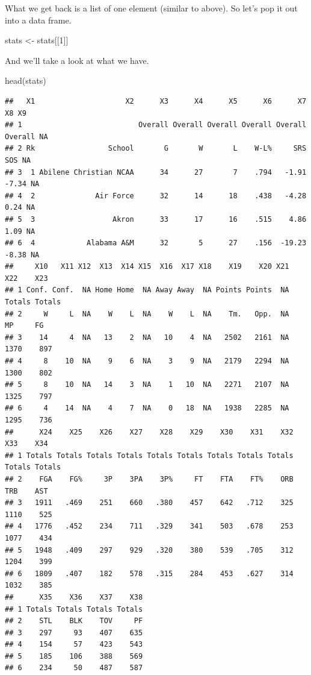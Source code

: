 \documentclass[
]{book}
\newenvironment{Shaded}{\begin{snugshade}}{\end{snugshade}}
\newcommand{\DecValTok}[1]{\textcolor[rgb]{0.00,0.00,0.81}{#1}}
\newcommand{\FunctionTok}[1]{\textcolor[rgb]{0.00,0.00,0.00}{#1}}
\newcommand{\NormalTok}[1]{#1}
\newcommand{\OtherTok}[1]{\textcolor[rgb]{0.56,0.35,0.01}{#1}}
\begin{document}
What we get back is a list of one element (similar to above). So let's pop it out into a data frame.

\begin{Shaded}
\begin{Highlighting}[]
\NormalTok{stats }\OtherTok{\textless{}{-}}\NormalTok{ stats[[}\DecValTok{1}\NormalTok{]]}
\end{Highlighting}
\end{Shaded}

And we'll take a look at what we have.

\begin{Shaded}
\begin{Highlighting}[]
\FunctionTok{head}\NormalTok{(stats)}
\end{Highlighting}
\end{Shaded}

\begin{verbatim}
##   X1                     X2      X3      X4      X5      X6      X7      X8 X9
## 1                           Overall Overall Overall Overall Overall Overall NA
## 2 Rk                 School       G       W       L    W-L%     SRS     SOS NA
## 3  1 Abilene Christian NCAA      34      27       7    .794   -1.91   -7.34 NA
## 4  2              Air Force      32      14      18    .438   -4.28    0.24 NA
## 5  3                  Akron      33      17      16    .515    4.86    1.09 NA
## 6  4            Alabama A&M      32       5      27    .156  -19.23   -8.38 NA
##     X10   X11 X12  X13  X14 X15  X16  X17 X18    X19    X20 X21    X22    X23
## 1 Conf. Conf.  NA Home Home  NA Away Away  NA Points Points  NA Totals Totals
## 2     W     L  NA    W    L  NA    W    L  NA    Tm.   Opp.  NA     MP     FG
## 3    14     4  NA   13    2  NA   10    4  NA   2502   2161  NA   1370    897
## 4     8    10  NA    9    6  NA    3    9  NA   2179   2294  NA   1300    802
## 5     8    10  NA   14    3  NA    1   10  NA   2271   2107  NA   1325    797
## 6     4    14  NA    4    7  NA    0   18  NA   1938   2285  NA   1295    736
##      X24    X25    X26    X27    X28    X29    X30    X31    X32    X33    X34
## 1 Totals Totals Totals Totals Totals Totals Totals Totals Totals Totals Totals
## 2    FGA    FG%     3P    3PA    3P%     FT    FTA    FT%    ORB    TRB    AST
## 3   1911   .469    251    660   .380    457    642   .712    325   1110    525
## 4   1776   .452    234    711   .329    341    503   .678    253   1077    434
## 5   1948   .409    297    929   .320    380    539   .705    312   1204    399
## 6   1809   .407    182    578   .315    284    453   .627    314   1032    385
##      X35    X36    X37    X38
## 1 Totals Totals Totals Totals
## 2    STL    BLK    TOV     PF
## 3    297     93    407    635
## 4    154     57    423    543
## 5    185    106    388    569
## 6    234     50    487    587
\end{verbatim}
\end{document}
